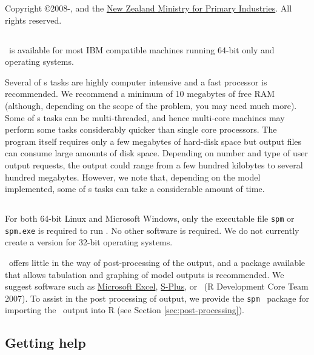 Copyright \copyright 2008-\SourceControlYearDoc, \href{http://www.niwa.co.nz}{\Organisation} and the \href{http://www.mpi.govt.nz}{New Zealand Ministry for Primary Industries}. All rights reserved.

\subsection{}

\SPM\ is available for most IBM compatible machines running 64-bit only  and  operating systems.

Several of \SPM s tasks are highly computer intensive and a fast processor is recommended. We recommend a minimum of 10 megabytes of free RAM (although, depending on the scope of the problem, you may need much more). Some of \SPM s tasks can be multi-threaded, and hence multi-core machines may perform some tasks considerably quicker than single core processors. The program itself requires only a few megabytes of hard-disk space but output files can consume large amounts of disk space. Depending on number and type of user output requests, the output could range from a few hundred kilobytes to several hundred megabytes. However, we note that, depending on the model implemented, some of \SPM s tasks can take a considerable amount of time.

\subsection{}

For both 64-bit Linux and Microsoft Windows, only the executable file \texttt{spm} or \texttt{spm.exe} is required to run \SPM . No other software is required. We do not currently create a version for 32-bit operating systems. 

\SPM\ offers little in the way of  post-processing of the output, and a package available that allows tabulation and graphing of model outputs is recommended. We suggest software such as \href{http://www.microsoft.com}{Microsoft Excel}, \href{http://www.insightful.com}{S-Plus}, or \href{http://www.r-project.org}{\R}\ (R Development Core Team 2007). To assist in the post processing of \SPM output, we provide the \texttt{spm} \R\ package for importing the \SPM\ output into R (see Section \ref{sec:post-processing}).

\subsection{Getting help}


